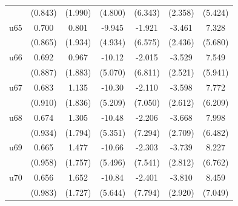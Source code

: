 \begin{table}[htbp]
\begin{tabular}{l*{6}{c}}
                    &     (0.843)         &     (1.990)         &     (4.800)         &     (6.343)         &     (2.358)         &     (5.424)         \\
\addlinespace
u65                 &       0.700         &       0.801         &      -9.945\sym{**} &      -1.921         &      -3.461         &       7.328         \\
                    &     (0.865)         &     (1.934)         &     (4.934)         &     (6.575)         &     (2.436)         &     (5.680)         \\
\addlinespace
u66                 &       0.692         &       0.967         &      -10.12\sym{**} &      -2.015         &      -3.529         &       7.549         \\
                    &     (0.887)         &     (1.883)         &     (5.070)         &     (6.811)         &     (2.521)         &     (5.941)         \\
\addlinespace
u67                 &       0.683         &       1.135         &      -10.30\sym{**} &      -2.110         &      -3.598         &       7.772         \\
                    &     (0.910)         &     (1.836)         &     (5.209)         &     (7.050)         &     (2.612)         &     (6.209)         \\
\addlinespace
u68                 &       0.674         &       1.305         &      -10.48\sym{*}  &      -2.206         &      -3.668         &       7.998         \\
                    &     (0.934)         &     (1.794)         &     (5.351)         &     (7.294)         &     (2.709)         &     (6.482)         \\
\addlinespace
u69                 &       0.665         &       1.477         &      -10.66\sym{*}  &      -2.303         &      -3.739         &       8.227         \\
                    &     (0.958)         &     (1.757)         &     (5.496)         &     (7.541)         &     (2.812)         &     (6.762)         \\
\addlinespace
u70                 &       0.656         &       1.652         &      -10.84\sym{*}  &      -2.401         &      -3.810         &       8.459         \\
                    &     (0.983)         &     (1.727)         &     (5.644)         &     (7.794)         &     (2.920)         &     (7.049)         \\

\end{tabular}
\end{table}
